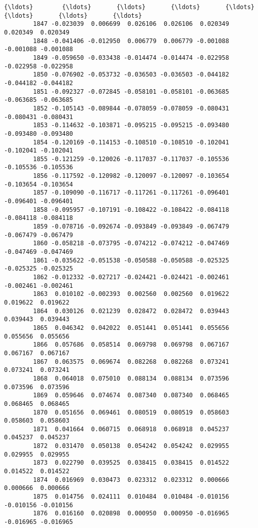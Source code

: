 \documentclass[11pt]{article}
\begin{document}
\begin{Verbatim}[commandchars=\\\{\}]
        {\ldots}        {\ldots}       {\ldots}       {\ldots}       {\ldots}       {\ldots}       {\ldots}       {\ldots}   
        1847 -0.023039  0.006699  0.026106  0.026106  0.020349  0.020349  0.020349   
        1848 -0.041406 -0.012950  0.006779  0.006779 -0.001088 -0.001088 -0.001088   
        1849 -0.059650 -0.033438 -0.014474 -0.014474 -0.022958 -0.022958 -0.022958   
        1850 -0.076902 -0.053732 -0.036503 -0.036503 -0.044182 -0.044182 -0.044182   
        1851 -0.092327 -0.072845 -0.058101 -0.058101 -0.063685 -0.063685 -0.063685   
        1852 -0.105143 -0.089844 -0.078059 -0.078059 -0.080431 -0.080431 -0.080431   
        1853 -0.114632 -0.103871 -0.095215 -0.095215 -0.093480 -0.093480 -0.093480   
        1854 -0.120169 -0.114153 -0.108510 -0.108510 -0.102041 -0.102041 -0.102041   
        1855 -0.121259 -0.120026 -0.117037 -0.117037 -0.105536 -0.105536 -0.105536   
        1856 -0.117592 -0.120982 -0.120097 -0.120097 -0.103654 -0.103654 -0.103654   
        1857 -0.109090 -0.116717 -0.117261 -0.117261 -0.096401 -0.096401 -0.096401   
        1858 -0.095957 -0.107191 -0.108422 -0.108422 -0.084118 -0.084118 -0.084118   
        1859 -0.078716 -0.092674 -0.093849 -0.093849 -0.067479 -0.067479 -0.067479   
        1860 -0.058218 -0.073795 -0.074212 -0.074212 -0.047469 -0.047469 -0.047469   
        1861 -0.035622 -0.051538 -0.050588 -0.050588 -0.025325 -0.025325 -0.025325   
        1862 -0.012332 -0.027217 -0.024421 -0.024421 -0.002461 -0.002461 -0.002461   
        1863  0.010102 -0.002393  0.002560  0.002560  0.019622  0.019622  0.019622   
        1864  0.030126  0.021239  0.028472  0.028472  0.039443  0.039443  0.039443   
        1865  0.046342  0.042022  0.051441  0.051441  0.055656  0.055656  0.055656   
        1866  0.057686  0.058514  0.069798  0.069798  0.067167  0.067167  0.067167   
        1867  0.063575  0.069674  0.082268  0.082268  0.073241  0.073241  0.073241   
        1868  0.064018  0.075010  0.088134  0.088134  0.073596  0.073596  0.073596   
        1869  0.059646  0.074674  0.087340  0.087340  0.068465  0.068465  0.068465   
        1870  0.051656  0.069461  0.080519  0.080519  0.058603  0.058603  0.058603   
        1871  0.041664  0.060715  0.068918  0.068918  0.045237  0.045237  0.045237   
        1872  0.031470  0.050138  0.054242  0.054242  0.029955  0.029955  0.029955   
        1873  0.022790  0.039525  0.038415  0.038415  0.014522  0.014522  0.014522   
        1874  0.016969  0.030473  0.023312  0.023312  0.000666  0.000666  0.000666   
        1875  0.014756  0.024111  0.010484  0.010484 -0.010156 -0.010156 -0.010156   
        1876  0.016160  0.020898  0.000950  0.000950 -0.016965 -0.016965 -0.016965   
        

\end{Verbatim}
\end{document}
